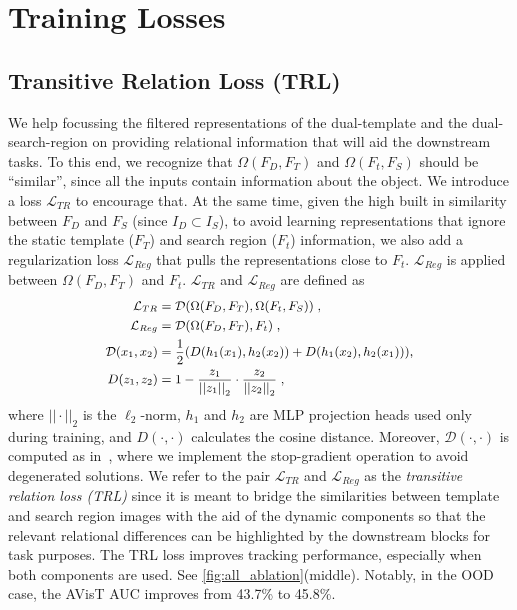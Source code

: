 \section{Training Losses}

\subsection{Transitive Relation Loss (TRL)}
We help focussing the filtered representations of the dual-template and the dual-search-region on providing relational information that will aid the downstream tasks. To this end, we recognize that $\Omega(F_D,F_T)$ and $\Omega(F_t,F_S)$ should be ``similar'', since all the inputs contain information about the object. We introduce a loss  $\mathcal{L}_{TR}$ to encourage that. At the same time, given the high built in similarity between $F_D$ and $F_S$ (since $I_D \subset I_S$), to avoid learning representations that ignore the static template ($F_T$) and search region ($F_t$) information, we also add a regularization loss $\mathcal{L}_{Reg}$ that pulls the representations close to $F_t$. $\mathcal{L}_{Reg}$ is applied between $\Omega(F_D,F_T)$ and $F_t$.
$\mathcal{L}_{TR}$ and $\mathcal{L}_{Reg}$ are defined as
\begin{equation}\small
  \centering
  \label{eq:relation}
      \begin{aligned} 
          \mathcal{L}_{TR}&=\mathcal{D}(\Omega(F_D,F_T),\Omega(F_t,F_S)) \; , \\
          \mathcal{L}_{Reg}&=\mathcal{D}(\Omega(F_D,F_T),F_t)\; , \\
          \mathcal{D}(x_1, x_2)&=\dfrac{1}{2} (D(h_1(x_1), h_2(x_2)) +  D(h_1(x_2), h_2(x_1))), \\
          D(z_1,z_2)&=1 - \dfrac{z_1}{{||z_1||}_2} \cdot \dfrac{z_2}{{||z_2||}_2} \; ,
      \end{aligned}
\end{equation}
where $||\cdot||_2$ is the $\ell_2$-norm,  $h_1$ and $h_2$ are MLP projection heads used only during training, and $D(\cdot, \cdot)$ calculates the cosine distance. Moreover, $\mathcal{D}(\cdot,\cdot)$ is computed as in~\cite{chen2021exploring}, where we implement the stop-gradient operation to avoid degenerated solutions. We refer to the pair $\mathcal{L}_{TR}$ and $\mathcal{L}_{Reg}$ as the \emph{transitive relation loss (TRL)} since it is meant to bridge the similarities between template and search region images with the aid of the dynamic components so that the relevant relational differences can be highlighted by the downstream blocks for task purposes. The TRL loss improves tracking performance, especially when both components are used. See \ref{fig:all_ablation}(middle). Notably, in the OOD case, the AVisT \cite{noman2022avist} AUC improves from 43.7\% to 45.8\%.


